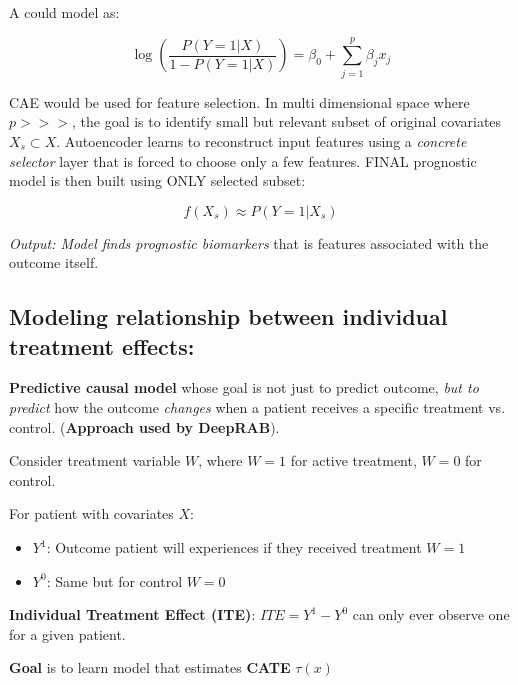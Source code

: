 \documentclass[../main.tex]{subfiles}
\begin{document}
A  could model as:

\begin{center}
    \[
    \log \left( \frac{P(Y=1|X)}{1 - P(Y=1|X)} \right) = \beta_0 + \sum_{j=1}^{p} \beta_j x_j
    \]
\end{center}

CAE would be used for feature selection. In multi dimensional space where $p >>>$, the goal is to identify small but relevant subset of original covariates $X_s \subset X$. Autoencoder learns to reconstruct input features using a \textit{concrete selector} layer that is forced to choose only a few features. FINAL prognostic model is then built using ONLY selected subset:

\begin{center}
    \[
    f(X_s) \approx P(Y=1|X_s)
    \]
\end{center}

\textit{Output: Model finds prognostic biomarkers} that is features associated with the outcome itself. 

\subsection*{Modeling relationship between individual treatment effects:}

\textbf{Predictive causal model} whose goal is not just to predict outcome, \textit{but to predict} how the outcome \textit{changes} when a patient receives a specific treatment vs. control. (\textbf{Approach used by DeepRAB}).

Consider treatment variable $W$, where $W=1$ for active treatment, $W=0$ for control.

For patient with covariates $X$:

\begin{itemize}
    \item $Y^1$: Outcome patient will experiences if they received treatment $W =1$
    \item $Y^0$: Same but for control $W=0$
\end{itemize}

\textbf{Individual Treatment Effect (ITE)}: $ITE=Y^1 - Y^0$ can only ever observe one for a given patient.

\vspace{0.2cm}

\textbf{Goal} is to learn model that estimates \textbf{CATE} $\tau(x)$

\vspace{0.2cm}
\end{document}
